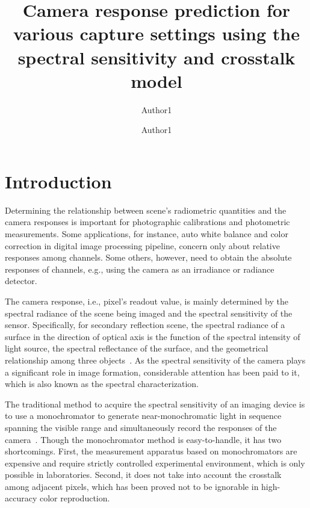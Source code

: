 \documentclass[9pt,twocolumn,twoside]{osajnl}
\title{Camera response prediction for various capture settings using the spectral sensitivity and crosstalk model}
\author[1]{Author1}
\author[1,*]{Author1}
\affil[1]{State Key Laboratory of Modern Optical Instrumentation, College of Optical Science and Engineering, Zhejiang University, Hangzhou 310027, China}
\affil[*]{Corresponding author: xxx@zju.edu.cn}
\providecommand{\DIFadd}[1]{{\protect\color{blue}\uwave{#1}}} %
\providecommand{\DIFaddbegin}{} %
\providecommand{\DIFaddend}{} %
\begin{document}
	\maketitle
	\thispagestyle{fancy}

	\linenumbers
	\section{Introduction}

	Determining the relationship between scene’s radiometric quantities and the camera responses is important for photographic calibrations and photometric measurements. Some applications, for instance, auto white balance and color correction in digital image processing pipeline, concern only about relative responses among channels. Some others, however, need to obtain the absolute responses of channels, e.g., using the camera as an irradiance or radiance detector.

	The camera response, i.e., pixel’s readout value, is mainly determined by the spectral radiance of the scene being imaged and the spectral sensitivity of the sensor. Specifically, for secondary reflection scene, the spectral radiance of a surface in the direction of optical axis is the function of the spectral intensity of light source, the spectral reflectance of the surface, and the geometrical relationship among three objects~\cite{Horn:79}. As the spectral sensitivity of the camera plays a significant role in image formation, considerable attention has been paid to it, which is also known as the spectral characterization.

	The traditional method to acquire the spectral sensitivity of an imaging device is to use a monochromator to generate near-monochromatic light in sequence spanning the visible range and simultaneously record the responses of the camera~\cite{Darrodi:15}. Though the monochromator method is easy-to-handle, it has two shortcomings. First, the measurement apparatus based on monochromators are expensive and require strictly controlled experimental environment, which is only possible in laboratories. Second, it does not take into account the crosstalk among adjacent pixels, which has been proved not to be ignorable in high-accuracy color reproduction\DIFaddbegin \DIFadd{~\mbox{%
\cite{Getman:07}}%
}\DIFaddend .
\end{document}
